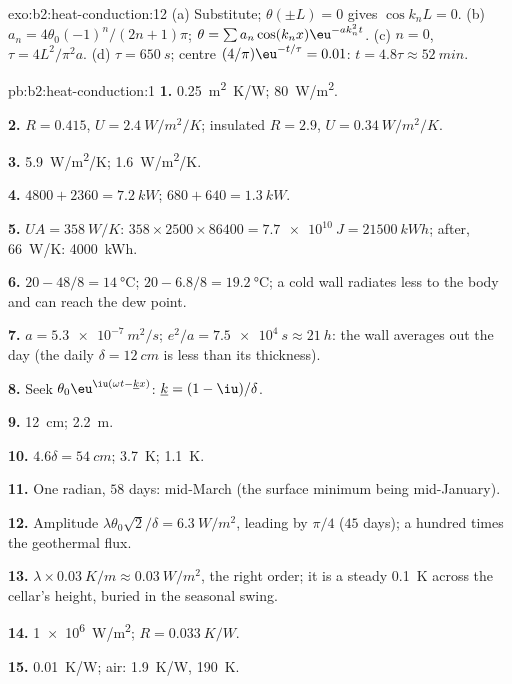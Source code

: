 \begin{solution}{exo:b2:heat-conduction:12}
(a) Substitute; $\theta(\pm L) = 0$ gives $\cos k_nL = 0$. (b) $a_n =
4\theta_0(-1)^n/(2n+1)\pi$; $\theta = \sum a_n\cos(k_nx)\eu^{-ak_n^2t}$. (c) $n = 0$,
$\tau = 4L^2/\pi^2a$. (d) $\tau = \qty{650}{s}$; centre $(4/\pi)\eu^{-t/\tau} = 0.01$:
$t = 4.8\tau \approx \qty{52}{min}$.
\end{solution}

\begin{solution}{pb:b2:heat-conduction:1}
\textbf{1.} \qty{0.25}{m^2.K/W}; \qty{80}{W/m^2}.

\textbf{2.} $R = 0.415$, $U = \qty{2.4}{W/m^2/K}$; insulated $R = 2.9$, $U =
\qty{0.34}{W/m^2/K}$.

\textbf{3.} \qty{5.9}{W/m^2/K}; \qty{1.6}{W/m^2/K}.

\textbf{4.} $4800 + 2360 = \qty{7.2}{kW}$; $680 + 640 = \qty{1.3}{kW}$.

\textbf{5.} $UA = \qty{358}{W/K}$: $358 \times 2500 \times 86400 = \qty{7.7e10}{J} =
\qty{21500}{kWh}$; after, \qty{66}{W/K}: \qty{4000}{kWh}.

\textbf{6.} $20 - 48/8 = \qty{14}{\celsius}$; $20 - 6.8/8 = \qty{19.2}{\celsius}$;
a cold wall radiates less to the body and can reach the dew point.

\textbf{7.} $a = \qty{5.3e-7}{m^2/s}$; $e^2/a = \qty{7.5e4}{s} \approx \qty{21}{h}$: the
wall averages out the day (the daily $\delta = \qty{12}{cm}$ is less than
its thickness).

\textbf{8.} Seek $\theta_0\eu^{\iu(\omega t - \underline kx)}$: $\underline k = (1 - \iu)/\delta$.

\textbf{9.} \qty{12}{cm}; \qty{2.2}{m}.

\textbf{10.} $4.6\delta = \qty{54}{cm}$; \qty{3.7}{K}; \qty{1.1}{K}.

\textbf{11.} One radian, $58$ days: mid-March (the surface minimum
being mid-January).

\textbf{12.} Amplitude $\lambda\theta_0\sqrt2/\delta = \qty{6.3}{W/m^2}$, leading by
$\pi/4$ ($45$ days); a hundred times the geothermal flux.

\textbf{13.} $\lambda \times \qty{0.03}{K/m} \approx \qty{0.03}{W/m^2}$, the right order; it
is a steady \qty{0.1}{K} across the cellar's height, buried in the
seasonal swing.

\textbf{14.} \qty{1e6}{W/m^2}; $R = \qty{0.033}{K/W}$.

\textbf{15.} \qty{0.01}{K/W}; air: \qty{1.9}{K/W}, \qty{190}{K}.


\end{solution}
